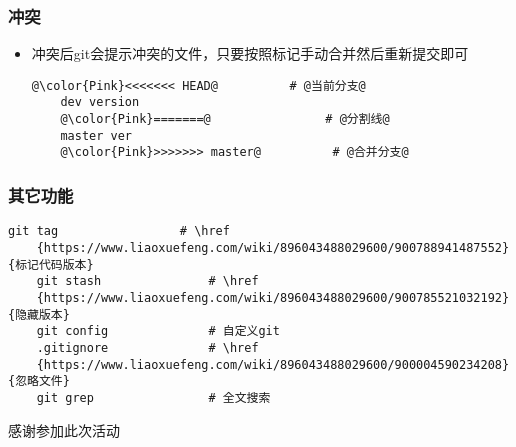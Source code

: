 \begin{frame} [fragile]
	\frametitle{冲突}
	\linespread{1.5}
	\begin{itemize}
	\item 冲突后git会提示冲突的文件，只要按照标记手动合并然后重新提交即可
	\begin{lstlisting}[basicstyle=\ttfamily, gobble=4, texcl, escapechar=@]
	@\color{Pink}<<<<<<< HEAD@			# @当前分支@
	dev version
	@\color{Pink}=======@				 # @分割线@
	master ver
	@\color{Pink}>>>>>>> master@		  # @合并分支@
	\end{lstlisting}
	\end{itemize}
\end{frame}

\begin{frame} [fragile]
	\frametitle{其它功能}
	\linespread{1.5}
	\begin{lstlisting}[style=bashstyle, gobble=4, texcl, escapechar=@]
	git tag					# \href
	{https://www.liaoxuefeng.com/wiki/896043488029600/900788941487552}{标记代码版本}
	git stash				# \href
	{https://www.liaoxuefeng.com/wiki/896043488029600/900785521032192}{隐藏版本}
	git config				# 自定义git
	.gitignore				# \href
	{https://www.liaoxuefeng.com/wiki/896043488029600/900004590234208}{忽略文件}
	git grep				# 全文搜索
	\end{lstlisting}
\end{frame}

\PreLastFrame
\begin{frame}
	\centerline{\fontsize{32}{32}\selectfont 感谢参加此次活动}
\end{frame}

\newpage


